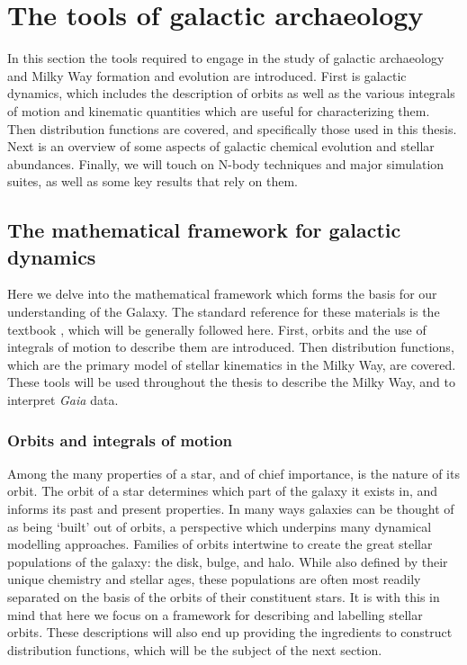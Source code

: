 \section{The tools of galactic archaeology}

In this section the tools required to engage in the study of galactic archaeology and Milky Way formation and evolution are introduced. First is galactic dynamics, which includes the description of orbits as well as the various integrals of motion and kinematic quantities which are useful for characterizing them. Then distribution functions are covered, and specifically those used in this thesis. Next is an overview of some aspects of galactic chemical evolution and stellar abundances. Finally, we will touch on N-body techniques and major simulation suites, as well as some key results that rely on them. 

\subsection{The mathematical framework for galactic dynamics}

Here we delve into the mathematical framework which forms the basis for our understanding of the Galaxy. The standard reference for these materials is the textbook \textcite{binney08}, which will be generally followed here. First, orbits and the use of integrals of motion to describe them are introduced. Then distribution functions, which are the primary model of stellar kinematics in the Milky Way, are covered. These tools will be used throughout the thesis to describe the Milky Way, and to interpret \textit{Gaia} data.

\subsubsection{Orbits and integrals of motion}

Among the many properties of a star, and of chief importance, is the nature of its orbit. The orbit of a star determines which part of the galaxy it exists in, and informs its past and present properties. In many ways galaxies can be thought of as being `built' out of orbits, a perspective which underpins many dynamical modelling approaches. Families of orbits intertwine to create the great stellar populations of the galaxy: the disk, bulge, and halo. While also defined by their unique chemistry and stellar ages, these populations are often most readily separated on the basis of the orbits of their constituent stars. It is with this in mind that here we focus on a framework for describing and labelling stellar orbits. These descriptions will also end up providing the ingredients to construct distribution functions, which will be the subject of the next section.

